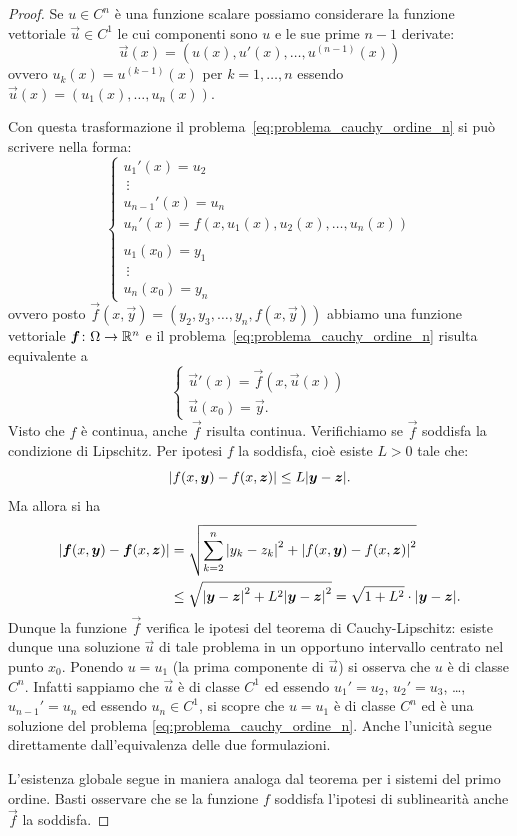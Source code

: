 \begin{proof}
Se $u\in C^n$ è una funzione scalare possiamo considerare la funzione vettoriale $\vec u \in C^1$ le cui componenti sono $u$ e le sue prime $n-1$ derivate:
\[
\vec u(x) = (u(x), u'(x), \dots, u^{(n-1)}(x))
\]
ovvero $u_k(x) = u^{(k-1)}(x)$ per $k=1,\dots ,n$ essendo $\vec u(x) = (u_1(x), \dots, u_n(x))$.

Con questa trasformazione il problema~\eqref{eq:problema_cauchy_ordine_n} si può scrivere nella forma:
\[
 \begin{cases}
   u_1'(x) = u_2 \\
   \ \vdots \\
   u_{n-1}'(x) = u_n \\
   u_n'(x) = f(x, u_1(x), u_2(x), \dots, u_n(x))\\\\
   u_1(x_0) = y_1\\
   \ \vdots \\
   u_{n}(x_0) = y_n
 \end{cases}
\]
ovvero posto $\vec f(x,\vec y) = (y_2, y_3, \dots, y_n, f(x, \vec y))$ abbiamo una funzione vettoriale $\boldsymbol f\colon \Omega \to {\mathbb R}^n$ e il problema~\eqref{eq:problema_cauchy_ordine_n} risulta equivalente a
\begin{equation}\label{eq:437583}
  \begin{cases}
   \vec u'(x) = \vec f(x,\vec u(x))\\
   \vec u(x_0) = \vec y.
  \end{cases}
\end{equation}
Visto che $f$ è continua, anche $\vec f$ risulta continua.
Verifichiamo se $\vec f$ soddisfa la condizione di Lipschitz.
Per ipotesi $f$ la soddisfa, cioè
esiste $L>0$ tale che:
\[
  {\left|f(x,\boldsymbol y)-f(x,\boldsymbol z)\right|} \le L{\left|\boldsymbol y - \boldsymbol z\right|}.
\]
Ma allora si ha
\begin{align*}
{\left|\boldsymbol f(x,\boldsymbol y) - \boldsymbol f(x,\boldsymbol z)\right|}
  &= \sqrt{\sum_{k=2}^n {\left|y_k-z_k\right|}^2 + {\left|f(x,\boldsymbol y)-f(x,\boldsymbol z)\right|}^2} \\
  &\le \sqrt{{\left|\boldsymbol y - \boldsymbol z\right|}^2 + L^2 {\left|\boldsymbol y - \boldsymbol z\right|}^2}
  = \sqrt{1+L^2}\cdot {\left|\boldsymbol y - \boldsymbol z\right|}.
\end{align*}
Dunque la funzione $\vec f$ verifica le ipotesi del teorema di Cauchy\hyp{}Lipschitz: esiste dunque una soluzione $\vec u$ di tale problema in un opportuno intervallo centrato nel punto $x_0$.
Ponendo $u=u_1$ (la prima componente di $\vec u$)
si osserva che $u$ è di classe $C^n$.
Infatti sappiamo che $\vec u$ è di classe $C^1$
ed essendo
$u_1' = u_2$,
$u_2' = u_3$, \dots,
$u_{n-1}'=u_n$
ed essendo $u_n\in C^1$,
si scopre che $u=u_1$ è di classe $C^n$
ed è una soluzione del problema \eqref{eq:problema_cauchy_ordine_n}.
Anche l'unicità segue direttamente dall'equivalenza delle due formulazioni.

L'esistenza globale segue in maniera analoga dal teorema per i sistemi del primo ordine. Basti osservare che se la funzione $f$ soddisfa l'ipotesi di sublinearità anche $\vec f$ la soddisfa.
\end{proof}

